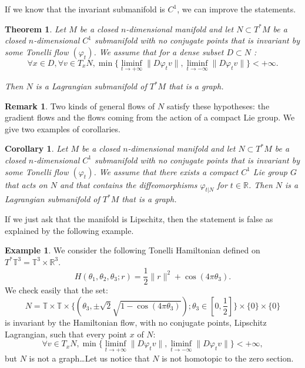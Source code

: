 \documentclass{dcds}
\newtheorem{theorem}{Theorem}[section]
\newtheorem{corollary}{Corollary}
\theoremstyle{definition}
\newtheorem{remark}{Remark}
\newtheorem{exa}{Example}
\begin{document}
 If we know that the invariant submanifold is $C^1$, we can improve the statements.

 \begin{theorem}\label{T2}
 Let $M$ be a closed $n$-dimensional manifold and let $N\subset T^*M$ be a closed $n$-dimensional $C^1$ submanifold with no conjugate points  that is invariant by some Tonelli flow $(\varphi_t)$. We assume that for a dense subset $D\subset N$ : 
 $$\forall x\in D, \forall v\in T_xN, \min\{ \liminf_{t\rightarrow +\infty}\| D\varphi_tv\|, \liminf_{t\rightarrow -\infty} \| D\varphi_tv\|\}<+\infty.$$

  Then $N$ is a   Lagrangian submanifold of $T^*M$ that is a graph.
 \end{theorem}
 \begin{remark}
Two kinds of general flows of $N$ satisfy these hypotheses: the gradient flows and the flows coming from the action of a compact Lie group. We give two examples of corollaries.
\end{remark}
\begin{corollary}\label{C4}
   Let $M$ be a closed $n$-dimensional manifold and let $N\subset T^*M$ be a closed $n$-dimensional $C^1$ submanifold with no conjugate points  that is invariant by some Tonelli flow $(\varphi_t)$. We assume that there exists a compact $C^1$ Lie group $G$ that acts on $N$ and that contains the diffeomorphisms  $ \varphi_{t|N} $ for $t\in{\mathbb {R}}$.  Then $N$ is a   Lagrangian submanifold of $T^*M$ that is a graph.
     \end{corollary}

       If we just ask that the manifold is Lipschitz, then the statement is false as explained by the following example.

     \begin{exa} We consider the following Tonelli Hamiltonian defined on $T^*{\mathbb {T}}^3={\mathbb {T}}^3\times {\mathbb {R}}^3$.
     $$H(\theta_1, \theta_2, \theta_3; r)=\frac{1}{2}\| r\|^2+\cos(4\pi\theta_3).$$
     We check easily that the set:
     $$N={\mathbb {T}}\times {\mathbb {T}}\times \{ (\theta_3, \pm\sqrt{2}\sqrt{1-\cos(4\pi\theta_3)}); \theta_3\in [0, \frac{1}{2}]\}\times \{0\}\times\{ 0\}$$
     is invariant by the Hamiltonian flow, with no conjugate  points, Lipschitz Lagrangian, such that every
    point $x$ of $N$:
      $$  \forall v\in T_xN, \min\{ \liminf_{t\rightarrow +\infty}\| D\varphi_tv\|, \liminf_{t\rightarrow -\infty} \| D\varphi_tv\|\}<+\infty,$$
      but $N$ is not a graph\dots Let us notice that $N$ is not homotopic to the zero section.
     \end{exa}
\end{document}
